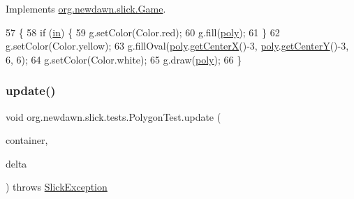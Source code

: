 Implements \mbox{\hyperlink{interfaceorg_1_1newdawn_1_1slick_1_1_game_af1a4670d43eb3ba04dfcf55ab1975b64}{org.\+newdawn.\+slick.\+Game}}.


\begin{DoxyCode}
57                                                                                   \{
58         \textcolor{keywordflow}{if} (\mbox{\hyperlink{classorg_1_1newdawn_1_1slick_1_1tests_1_1_polygon_test_ab090a6129c72d1e91c59185d568fb381}{in}}) \{
59             g.setColor(Color.red);
60             g.fill(\mbox{\hyperlink{classorg_1_1newdawn_1_1slick_1_1tests_1_1_polygon_test_a9208c4dd8be9ef4468e17c2d6f0fdff0}{poly}});
61         \}
62         g.setColor(Color.yellow);
63         g.fillOval(\mbox{\hyperlink{classorg_1_1newdawn_1_1slick_1_1tests_1_1_polygon_test_a9208c4dd8be9ef4468e17c2d6f0fdff0}{poly}}.\mbox{\hyperlink{classorg_1_1newdawn_1_1slick_1_1geom_1_1_shape_aa8f8cb519727d4ef8737819b4f1dd7b6}{getCenterX}}()-3, \mbox{\hyperlink{classorg_1_1newdawn_1_1slick_1_1tests_1_1_polygon_test_a9208c4dd8be9ef4468e17c2d6f0fdff0}{poly}}.\mbox{\hyperlink{classorg_1_1newdawn_1_1slick_1_1geom_1_1_shape_a9937c71e414375a9974c7a5d8fcc06e5}{getCenterY}}()-3, 6, 6);
64         g.setColor(Color.white);
65         g.draw(\mbox{\hyperlink{classorg_1_1newdawn_1_1slick_1_1tests_1_1_polygon_test_a9208c4dd8be9ef4468e17c2d6f0fdff0}{poly}});
66     \}
\end{DoxyCode}
\mbox{\label{classorg_1_1newdawn_1_1slick_1_1tests_1_1_polygon_test_a083755d80e156800da238c166f908cf8}} 
\subsubsection{\texorpdfstring{update()}{update()}}
{\footnotesize\ttfamily void org.\+newdawn.\+slick.\+tests.\+Polygon\+Test.\+update (\begin{DoxyParamCaption}\item[{\mbox{\hyperlink{classorg_1_1newdawn_1_1slick_1_1_game_container}{Game\+Container}}}]{container,  }\item[{int}]{delta }\end{DoxyParamCaption}) throws \mbox{\hyperlink{classorg_1_1newdawn_1_1slick_1_1_slick_exception}{Slick\+Exception}}\hspace{0.3cm}{\ttfamily [inline]}}

